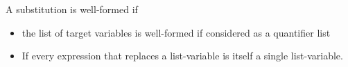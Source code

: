 A substitution is well-formed if
\begin{itemize}
  \item the list of target variables is well-formed if considered
  as a quantifier list
  \item If every expression that replaces a list-variable
        is itself a single list-variable.
\end{itemize}
